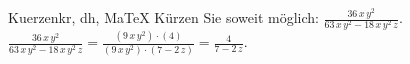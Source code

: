 \begin{MAufgabe}{Kuerzen}{kr, dh, MaTeX}
K\"urzen Sie soweit m\"oglich: $\frac{36\, x\, y^2}{63\, x\, y^2 - 18\, x\, y^2\, z}$.\\ 
\ifLsg\MLoesung
\quad $\frac{36\, x\, y^2}{63\, x\, y^2 - 18\, x\, y^2\, z}=\frac{(9\, x\, y^2)\cdot(4)}{(9\, x\, y^2)\cdot(7 - 2\, z)}=\frac{4}{7 - 2\, z}$.\else\relax\fi
 \end{MAufgabe}